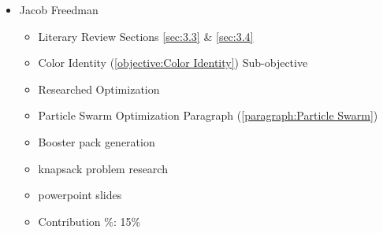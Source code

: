 \documentclass[12pt, letterpaper]{article}
\begin{document}
\begin{itemize}
\begin{itemize}
\end{itemize}

\item Jacob Freedman

\begin{itemize}

    \item Literary Review Sections \ref{sec:3.3} \& \ref{sec:3.4}
    \item Color Identity (\ref{objective:Color Identity}) Sub-objective
    \item Researched Optimization
    \item Particle Swarm Optimization Paragraph (\ref{paragraph:Particle Swarm})
	\item Booster pack generation
	\item knapsack problem research
	\item powerpoint slides
    \item Contribution \%: 15\%

\end{itemize}

\end{itemize}
\end{document}
